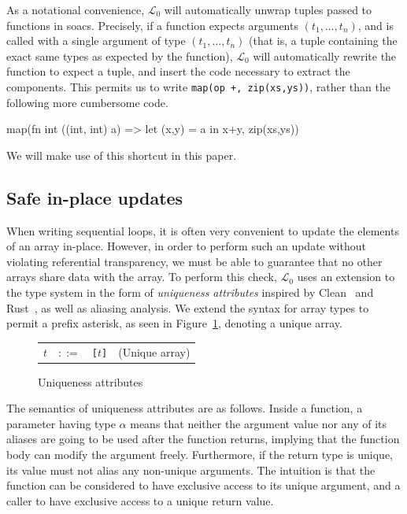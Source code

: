 \documentclass{sigplanconf}  %
\newcommand{\LO}{$\mathcal{L}_0$}
\begin{document}
As a notational convenience, \LO{} will automatically unwrap tuples
passed to functions in {\sc soac}s.  Precisely, if a function expects
arguments $(t_{1},\ldots,t_{n})$, and is called with a single argument
of type $(t_{1},\ldots,t_{n})$ (that is, a tuple containing the exact
same types as expected by the function), \LO{} will automatically
rewrite the function to expect a tuple, and insert the code necessary
to extract the components.  This permits us to write {\tt map(op +,
  zip(xs,ys))}, rather than the following more cumbersome code.
\begin{colorcode}
  map(fn int ((int, int) a) => let (x,y) = a in x+y,
      zip(xs,ys))
\end{colorcode}
We will make use of this shortcut in this paper.

\subsection{Safe in-place updates}
\label{sec:in-place}

When writing sequential loops, it is often very convenient to update
the elements of an array in-place.  However, in order to perform such
an update without violating referential transparency, we must be able
to guarantee that no other arrays share data with the array.  To
perform this check, \LO{} uses an extension to the type system in the
form of {\em uniqueness attributes} inspired by
Clean~\cite{clean-uniqueness-types} and Rust~\cite{rust}, as well as
aliasing analysis.  We extend the syntax for array types to permit a
prefix asterisk, as seen in Figure~\ref{fig:uniqueness-types},
denoting a unique array.

\begin{figure}[bt]
\begin{tabular}{lrll}
$t$ & $::=$ & {\tt *[$t$]} & (Unique array) \\
\end{tabular}
\caption{Uniqueness attributes}
\label{fig:uniqueness-types}
\end{figure}

The semantics of uniqueness attributes are as follows.  Inside a
function, a parameter having type {\tt *$\alpha$} means that neither
the argument value nor any of its aliases are going to be used after
the function returns, implying that the function body can modify the
argument freely.  Furthermore, if the return type is unique, its value
must not alias any non-unique arguments.  The intuition is that the
function can be considered to have exclusive access to its unique
argument, and a caller to have exclusive access to a unique return
value.
\end{document}
